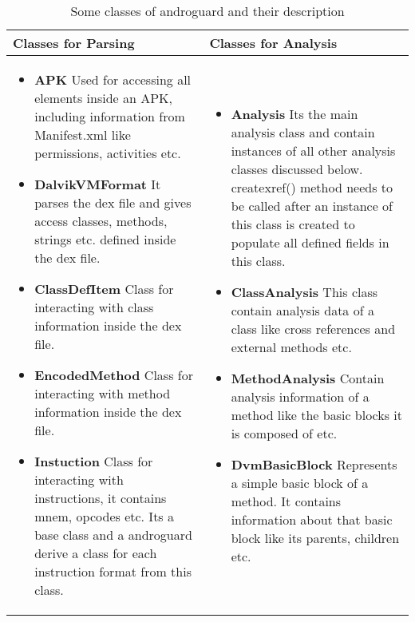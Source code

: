 \documentclass[../main.tex]{subfile}
\begin{document}
			\begin{table}[H]
				\begin{center}
					\begin{tabular}{|p{5cm}|p{5cm}|}
						\hline \textbf{Classes for Parsing} & \textbf{Classes for Analysis}\\ \hline
						\begin{itemize}
							\item \textbf{APK} Used for accessing all elements inside an APK, including information from Manifest.xml like permissions, activities etc.
							\item \textbf{DalvikVMFormat}	It parses the dex file and gives access classes, methods, strings etc. defined inside the dex file.
							\item \textbf{ClassDefItem} Class for interacting with class information inside the dex file.
							\item \textbf{EncodedMethod} Class for interacting with method information inside the dex file. 
							\item \textbf{Instuction} Class for interacting with instructions, it contains mnem, opcodes etc. Its a base class and a androguard derive a class for each instruction format from this class.
						\end{itemize}
						
						&
						
						\begin{itemize}
							\item \textbf{Analysis} Its the main analysis class and contain instances of all other analysis classes discussed below. create\textunderscore xref() method needs to be called after an instance of this class is created to populate all defined fields in this class.
							\item \textbf{ClassAnalysis} This class contain analysis data of a class like cross references and external methods etc.
							\item \textbf{MethodAnalysis} Contain analysis information of a method like the basic blocks it is composed of etc.
							\item \textbf{DvmBasicBlock} Represents a simple basic block of a method. It contains information about that basic block like its parents, children etc.
						\end{itemize}\\ \hline
						
					\end{tabular}
				\end{center}
				\caption{Some classes of androguard and their description}
				\label{table:androguard_classes}
			\end{table}
\end{document}
